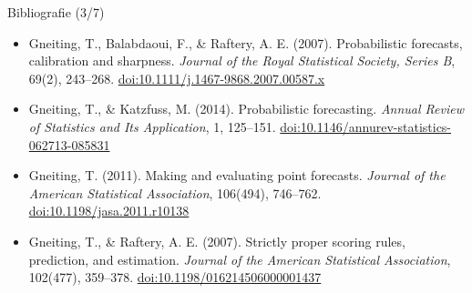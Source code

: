 \begin{frame}{Bibliografie (3/7)}
\begin{itemize}
    \item Gneiting, T., Balabdaoui, F., \& Raftery, A. E. (2007). Probabilistic forecasts, calibration and sharpness. \textit{Journal of the Royal Statistical Society, Series B}, 69(2), 243--268. \href{https://doi.org/10.1111/j.1467-9868.2007.00587.x}{doi:10.1111/j.1467-9868.2007.00587.x}
    \item Gneiting, T., \& Katzfuss, M. (2014). Probabilistic forecasting. \textit{Annual Review of Statistics and Its Application}, 1, 125--151. \href{https://doi.org/10.1146/annurev-statistics-062713-085831}{doi:10.1146/annurev-statistics-062713-085831}
    \item Gneiting, T. (2011). Making and evaluating point forecasts. \textit{Journal of the American Statistical Association}, 106(494), 746--762. \href{https://doi.org/10.1198/jasa.2011.r10138}{doi:10.1198/jasa.2011.r10138}
    \item Gneiting, T., \& Raftery, A. E. (2007). Strictly proper scoring rules, prediction, and estimation. \textit{Journal of the American Statistical Association}, 102(477), 359--378. \href{https://doi.org/10.1198/016214506000001437}{doi:10.1198/016214506000001437}
\end{itemize}
\end{frame}

